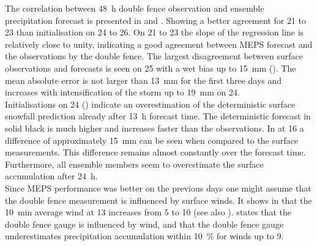 \noindent
The correlation between \SI{48}{\hour} double fence observation and ensemble precipitation forecast is presented in  and . Showing a better agreement for \num{21} to \SI{23}{\dec} than initialisation on \num{24} to \SI{26}{\dec}. On \num{21} to \SI{23}{\dec} the slope of the regression line is relatively close to unity, indicating a good agreement between MEPS forecast and the observations by the double fence.
The largest disagreement between surface observations and forecasts is seen on \SI{25}{\dec} with a wet bias up to \SI{15}{\mm} (). The mean absolute error is not larger than \SI{13}{\mm} for the first three days and increases with intensification of the storm up to \SI{19}{\mm} on \SI{24}{\dec}.
\\
Initialisations on \SI{24}{\dec} () indicate an overestimation of the deterministic surface snowfall prediction already after \SI{13}{\hour} forecast time. The deterministic forecast in solid black is much higher and increases faster than the observations. In  at \SI{16}{\UTC} a difference of approximately \SI{15}{\mm} can be seen when compared to the surface measurements. This difference remains almost constantly over the forecast time. Furthermore, all ensemble members seem to overestimate the surface accumulation after \SI{24}{\hour}. 
\\
Since MEPS performance was better on the previous days one might assume that the double fence measurement is influenced by surface winds. It shows in  that the \SI{10}{\minute} average wind at \SI{13}{\UTC} increases from \SI{5}{\mPs} to \SI{10}{\mPs} (see also ). \citet{wolff_wmo_2018} states that the double fence gauge is influenced by wind, and that the double fence gauge underestimates precipitation accumulation within \SI{10}{\percent} for winds up to \SI{9}{\mPs}.
